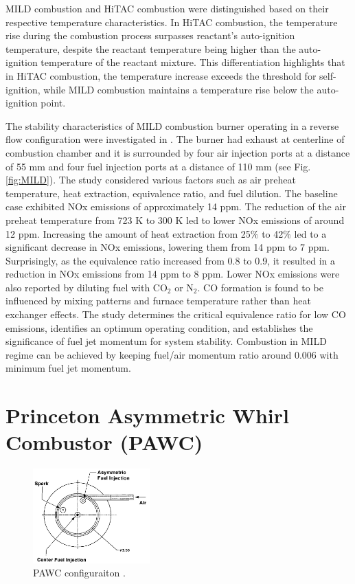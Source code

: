 MILD combustion and HiTAC combustion were distinguished based on their respective temperature characteristics. In HiTAC combustion, the temperature rise during the combustion process surpasses reactant's auto-ignition temperature, despite the reactant temperature being higher than the auto-ignition temperature of the reactant mixture. This differentiation highlights that in HiTAC combustion, the temperature increase exceeds the threshold for self-ignition, while MILD combustion maintains a temperature rise below the auto-ignition point.

The stability characteristics of MILD combustion burner operating in a reverse flow configuration were investigated in \cite{SZEGO2009429}. The burner had exhaust at centerline of combustion chamber and it is surrounded by four air injection ports at a distance of 55 mm and four fuel injection ports at a distance of 110 mm (see Fig. \ref{fig:MILD}). The study considered various factors such as air preheat temperature, heat extraction, equivalence ratio, and fuel dilution. The baseline case exhibited NOx emissions of approximately 14 ppm. The reduction of the air preheat temperature from 723 K to 300 K led to lower NOx emissions of around 12 ppm. Increasing the amount of heat extraction from 25$\%$ to 42$\%$ led to a significant decrease in NOx emissions, lowering them from 14 ppm to 7 ppm. Surprisingly, as the equivalence ratio increased from 0.8 to 0.9, it resulted in a reduction in NOx emissions from 14 ppm to 8 ppm. Lower NOx emissions were also reported by diluting fuel with CO$_2$ or N$_2$. CO formation is found to be influenced by mixing patterns and furnace temperature rather than heat exchanger effects. The study determines the critical equivalence ratio for low CO emissions, identifies an optimum operating condition, and establishes the significance of fuel jet momentum for system stability. Combustion in MILD regime can be achieved by keeping fuel/air momentum ratio around 0.006 with minimum fuel jet momentum.

\section{Princeton Asymmetric Whirl Combustor (PAWC)}
\begin{figure}
    \centering
    \includegraphics[width=0.4\textwidth]{Chapter2/Images/PAWC.jpeg}
  \caption[PAWC configuraiton]{PAWC configuraiton \cite{YETTER20001265}.}
  \label{fig:PAWC}
\end{figure}

